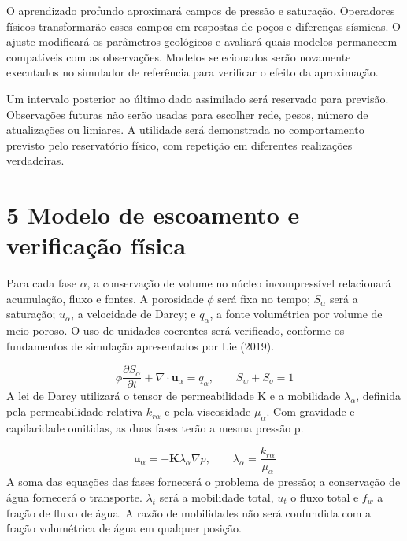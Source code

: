 \documentclass[12pt,a4paper]{article}
\begin{document}
O aprendizado profundo aproximará campos de pressão e saturação. Operadores físicos transformarão esses campos em respostas de poços e diferenças sísmicas. O ajuste modificará os parâmetros geológicos e avaliará quais modelos permanecem compatíveis com as observações. Modelos selecionados serão novamente executados no simulador de referência para verificar o efeito da aproximação.\par
Um intervalo posterior ao último dado assimilado será reservado para previsão. Observações futuras não serão usadas para escolher rede, pesos, número de atualizações ou limiares. A utilidade será demonstrada no comportamento previsto pelo reservatório físico, com repetição em diferentes realizações verdadeiras.\par

\newpage
\section*{5 Modelo de escoamento e verificação física}
Para cada fase \(\alpha\), a conservação de volume no núcleo incompressível relacionará acumulação, fluxo e fontes. A porosidade \(\phi\) será fixa no tempo; \(S_{\alpha}\) será a saturação; \(u_{\alpha}\), a velocidade de Darcy; e \(q_{\alpha}\), a fonte volumétrica por volume de meio poroso. O uso de unidades coerentes será verificado, conforme os fundamentos de simulação apresentados por Lie (2019).\par

\begin{equation}
\phi\frac{\partial S_\alpha}{\partial t}+\nabla\cdot\mathbf u_\alpha=q_\alpha,\qquad S_w+S_o=1
\end{equation}
A lei de Darcy utilizará o tensor de permeabilidade K e a mobilidade \(\lambda_{\alpha}\), definida pela permeabilidade relativa \(k_{r\alpha}\) e pela viscosidade \(\mu_{\alpha}\). Com gravidade e capilaridade omitidas, as duas fases terão a mesma pressão p.\par

\begin{equation}
\mathbf u_\alpha=-\mathbf K\lambda_\alpha\nabla p,\qquad \lambda_\alpha=\frac{k_{r\alpha}}{\mu_\alpha}
\end{equation}
A soma das equações das fases fornecerá o problema de pressão; a conservação de água fornecerá o transporte. \(\lambda_{t}\) será a mobilidade total, \(u_{t}\) o fluxo total e \(f_{w}\) a fração de fluxo de água. A razão de mobilidades não será confundida com a fração volumétrica de água em qualquer posição.\par
\end{document}
